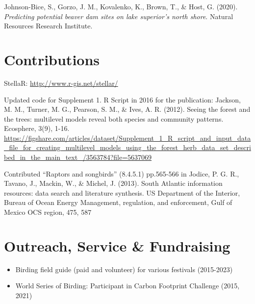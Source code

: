 \documentclass[11pt,a4paper,]{awesome-cv}
\providecommand{\tightlist}{%
	\setlength{\itemsep}{0pt}\setlength{\parskip}{0pt}}
\begin{document}
\leavevmode{}%
Johnson-Bice, S., Gorzo, J. M., Kovalenko, K., Brown, T., \& Host, G.
(2020). \emph{Predicting potential beaver dam sites on lake superior's
north shore}. Natural Resources Research Institute.

\hypertarget{contributions}{%
\section{Contributions}\label{contributions}}

StellaR: \url{http://www.r-gis.net/stellar/}

Updated code for Supplement 1. R Script in 2016 for the publication:
Jackson, M. M., Turner, M. G., Pearson, S. M., \& Ives, A. R. (2012).
Seeing the forest and the trees: multilevel models reveal both species
and community patterns. Ecosphere, 3(9), 1-16.
\url{https://figshare.com/articles/dataset/Supplement_1_R_script_and_input_data_file_for_creating_multilevel_models_using_the_forest_herb_data_set_described_in_the_main_text_/3563784?file=5637069}

Contributed ``Raptors and songbirds'' (8.4.5.1) pp.565-566 in Jodice, P.
G. R., Tavano, J., Mackin, W., \& Michel, J. (2013). South Atlantic
information resources: data search and literature synthesis. US
Department of the Interior, Bureau of Ocean Energy Management,
regulation, and enforcement, Gulf of Mexico OCS region, 475, 587

\hypertarget{outreach-service-fundraising}{%
\section{Outreach, Service \&
Fundraising}\label{outreach-service-fundraising}}

\begin{itemize}
\tightlist
\item
  Birding field guide (paid and volunteer) for various festivals
  (2015-2023)
\item
  World Series of Birding: Participant in Carbon Footprint Challenge
  (2015, 2021)
\end{itemize}


\label{LastPage}~
\end{document}
